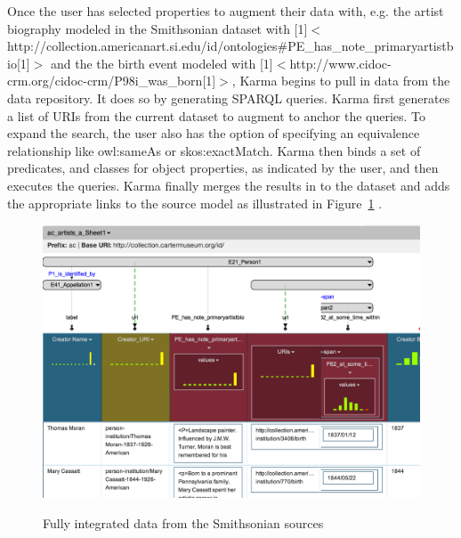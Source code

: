 Once the user has selected properties to augment their data with, e.g. the artist biography modeled in the Smithsonian dataset with \scalebox{.6}[1]{$<$}{http://collection.americanart.si.edu/id/ontologies\#PE\_has\_note\_primaryartistbio}\scalebox{.6}[1]{$>$} and the the birth event modeled with \scalebox{.6}[1]{$<$}{http://www.cidoc-crm.org/cidoc-crm/P98i\_was\_born}\scalebox{.6}[1]{$>$}, Karma begins to pull in data from the data repository.
It does so by generating SPARQL queries.  
Karma first generates a list of URIs from the current dataset to augment to anchor the queries.  
To expand the search, the user also has the option of specifying an equivalence relationship like owl:sameAs or skos:exactMatch.  
Karma then binds a set of predicates, and classes for object properties, as indicated by the user, and then executes the queries.  
Karma finally merges the results in to the dataset and adds the appropriate links to the source model as illustrated in Figure~\ref{fig:augment-screenshot}
.  
\begin{figure}
\begin{center}
\includegraphics[width=4.9in]{images/6-augment.png}
\vspace{-3mm}
\caption{Fully integrated data from the Smithsonian sources}
\vspace{-2mm}
\label{fig:augment-screenshot}
\end{center}
\vspace{-1.5em}
\end{figure}
